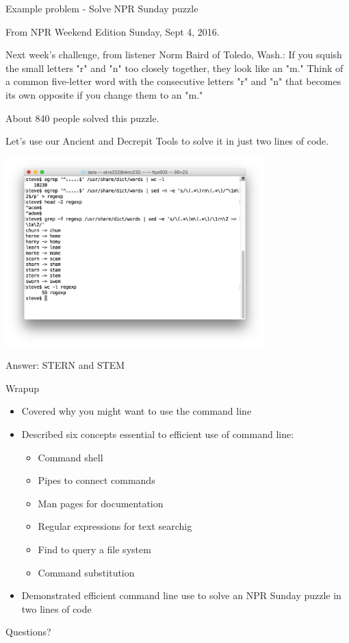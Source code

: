 \documentclass[t]{beamer}
\begin{document}
\begin{frame}{Example problem - Solve NPR Sunday puzzle}

  From NPR Weekend Edition Sunday, Sept 4, 2016.

  \bigskip
  Next week's challenge, from listener Norm Baird of Toledo, Wash.: If
  you squish the small letters "r" and "n" too closely together, they
  look like an "m." Think of a common five-letter word with the
  consecutive letters "r" and "n" that becomes its own opposite if you
  change them to an "m."
  
  \bigskip
  About 840 people solved this puzzle.
  
  \bigskip
  Let's use our Ancient and Decrepit Tools to solve it in just two
  lines of code.
  \note{}
\end{frame}

\begin{frame}{}
  \includegraphics[width=10cm,scale=0.4]{images/puzzle.png}

  Answer: STERN and STEM
  \note{}
\end{frame}

\begin{frame}{Wrapup}
  \begin{itemize}
  \item Covered why you might want to use the command line
  \item Described six concepts essential to efficient use of command
    line:
    \begin{itemize}
    \item Command shell
    \item Pipes to connect commands
    \item Man pages for documentation
    \item Regular expressions for text searchig
    \item Find to query a file system
    \item Command substitution
    \end{itemize}
  \item Demonstrated efficient command line use to solve an NPR Sunday puzzle
    in two lines of code
  \end{itemize}
  \note{}
\end{frame}

\begin{frame}{Questions?}
  \note{}
\end{frame}
\end{document}
